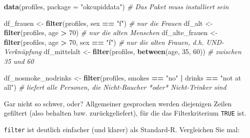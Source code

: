 \documentclass[12pt,ngerman,]{book}
\makeatletter
\newenvironment{Shaded}{\begin{snugshade}}{\end{snugshade}}
\newcommand{\KeywordTok}[1]{\textcolor[rgb]{0.13,0.29,0.53}{\textbf{#1}}}
\newcommand{\DataTypeTok}[1]{\textcolor[rgb]{0.13,0.29,0.53}{#1}}
\newcommand{\DecValTok}[1]{\textcolor[rgb]{0.00,0.00,0.81}{#1}}
\newcommand{\StringTok}[1]{\textcolor[rgb]{0.31,0.60,0.02}{#1}}
\newcommand{\CommentTok}[1]{\textcolor[rgb]{0.56,0.35,0.01}{\textit{#1}}}
\newcommand{\OperatorTok}[1]{\textcolor[rgb]{0.81,0.36,0.00}{\textbf{#1}}}
\newcommand{\NormalTok}[1]{#1}
\newenvironment{kframe}{%
\medskip{}
\setlength{\fboxsep}{.8em}
 \def\at@end@of@kframe{}%
 \ifinner\ifhmode%
  \def\at@end@of@kframe{\end{minipage}}%
  \begin{minipage}{\columnwidth}%
 \fi\fi%
 \def\FrameCommand##1{\hskip\@totalleftmargin \hskip-\fboxsep
 \colorbox{shadecolor}{##1}\hskip-\fboxsep
     \hskip-\linewidth \hskip-\@totalleftmargin \hskip\columnwidth}%
 \MakeFramed {\advance\hsize-\width
   \@totalleftmargin\z@ \linewidth\hsize
   \@setminipage}}%
 {\par\unskip\endMakeFramed%
 \at@end@of@kframe}
\renewenvironment{Shaded}{\begin{kframe}}{\end{kframe}}
\theoremstyle{definition}
\theoremstyle{definition}
\theoremstyle{remark}
\makeatother
\begin{document}
\begin{Shaded}
\begin{Highlighting}[]
\KeywordTok{data}\NormalTok{(profiles, }\DataTypeTok{package =} \StringTok{"okcupiddata"}\NormalTok{)  }\CommentTok{# Das Paket muss installiert sein}
\end{Highlighting}
\end{Shaded}

\begin{Shaded}
\begin{Highlighting}[]
\NormalTok{df_frauen <-}\StringTok{ }\KeywordTok{filter}\NormalTok{(profiles, sex }\OperatorTok{==}\StringTok{ "f"}\NormalTok{)  }\CommentTok{# nur die Frauen}
\NormalTok{df_alt <-}\StringTok{ }\KeywordTok{filter}\NormalTok{(profiles, age }\OperatorTok{>}\StringTok{ }\DecValTok{70}\NormalTok{)  }\CommentTok{# nur die alten Menschen}
\NormalTok{df_alte_frauen <-}\StringTok{ }\KeywordTok{filter}\NormalTok{(profiles, age }\OperatorTok{>}\StringTok{ }\DecValTok{70}\NormalTok{, sex }\OperatorTok{==}\StringTok{ "f"}\NormalTok{) }
\CommentTok{# nur die alten Frauen, d.h. UND-Verknüpfung}
\NormalTok{df_mittelalt <-}\StringTok{ }\KeywordTok{filter}\NormalTok{(profiles, }\KeywordTok{between}\NormalTok{(age, }\DecValTok{35}\NormalTok{, }\DecValTok{60}\NormalTok{))}
\CommentTok{# zwischen 35 und 60}

\NormalTok{df_nosmoke_nodrinks <-}\StringTok{ }\KeywordTok{filter}\NormalTok{(profiles, smokes }\OperatorTok{==}\StringTok{ "no"} \OperatorTok{|}\StringTok{ }\NormalTok{drinks }\OperatorTok{==}\StringTok{ "not at all"}\NormalTok{) }
\CommentTok{# liefert alle Personen, die Nicht-Raucher *oder* Nicht-Trinker sind}
\end{Highlighting}
\end{Shaded}

Gar nicht so schwer, oder? Allgemeiner gesprochen werden diejenigen
Zeilen gefiltert (also behalten bzw. zurückgeliefert), für die das
Filterkriterium \texttt{TRUE} ist.

\texttt{filter} ist deutlich einfacher (und klarer) als Standard-R.
Vergleichen Sie mal:

\begin{Shaded}
\end{Shaded}
\end{document}
